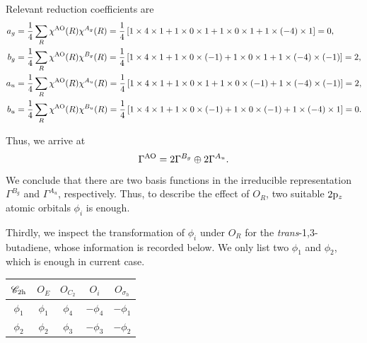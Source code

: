 \documentclass[a4paper]{book}
\newcommand{\AO}{{\rm AO}}
\newcommand{\orb}[1]{{\rm #1}}
\newcommand{\orbp}{\orb{p}}
\begin{document}
\begin{solution}
\begin{enumerate}[label=(\alph*)]
		Relevant reduction coefficients are
		\begin{align*}
		a_g &= \frac{1}{4} \sum_{R} \chi^{\AO}(R) \chi^{A_g}(R) = \frac{1}{4} \left[ 1 \times 4 \times 1 + 1 \times 0 \times 1 + 1 \times 0 \times 1 + 1 \times (-4) \times 1 \right] = 0, \\
		b_g &= \frac{1}{4} \sum_{R} \chi^{\AO}(R) \chi^{B_g}(R) = \frac{1}{4} \left[ 1 \times 4 \times 1 + 1 \times 0 \times (-1) + 1 \times 0 \times 1 + 1 \times (-4) \times (-1) \right] = 2, \\
		a_u &= \frac{1}{4} \sum_{R} \chi^{\AO}(R) \chi^{A_u}(R) = \frac{1}{4} \left[ 1 \times 4 \times 1 + 1 \times 0 \times 1 + 1 \times 0 \times (-1) + 1 \times (-4) \times (-1) \right] = 2, \\
		b_u &= \frac{1}{4} \sum_{R} \chi^{\AO}(R) \chi^{B_u}(R) = \frac{1}{4} \left[ 1 \times 4 \times 1 + 1 \times 0 \times (-1) + 1 \times 0 \times (-1) + 1 \times (-4) \times 1 \right] = 0.
		\end{align*}
		
		Thus, we arrive at
		\begin{equation*}
			\Gamma^{\AO} = 2 \Gamma^{B_g} \oplus 2 \Gamma^{A_u}.
		\end{equation*}
		We conclude that there are two basis functions in the irreducible representation $\Gamma^{B_g}$ and $\Gamma^{A_u}$, respectively. Thus, to describe the effect of $O_R$, two suitable $2 \orbp_z$ atomic orbitals $\phi_i$ is enough.
		
		Thirdly, we inspect the transformation of $\phi_i$ under $O_R$ for the {\it trans}-1,3-butadiene, whose information is recorded below. We only list two $\phi_1$ and $\phi_2$, which is enough in current case.
		\begin{center}
		\setlength{\abovecaptionskip}{0em}
		\begin{tabular}{ccccc}\hline
	$\mathscr{C}_{\rm 2h}$ & $O_E$ & $O_{C_2}$ & $O_i$ & $O_{\sigma_h}$ \\ \hline
			$\phi_1$	&	$\phi_1$	&	$\phi_4$	&	$-\phi_4$	&	$-\phi_1$	\\
			$\phi_2$	&	$\phi_2$	&	$\phi_3$	&	$-\phi_3$	&	$-\phi_2$	\\	\hline
		\end{tabular}
		\setlength{\belowcaptionskip}{0.5em}
		\end{center}
		

\end{enumerate}
\end{solution}
\end{document}

